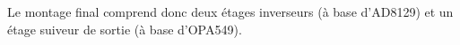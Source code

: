 \documentclass{template/tp}
\begin{document}
{\begin{enumerate}
		Le montage final comprend donc deux étages inverseurs (à base d'AD8129) et un étage suiveur de sortie (à base d'OPA549).
	\end{enumerate}
}


\end{document}
